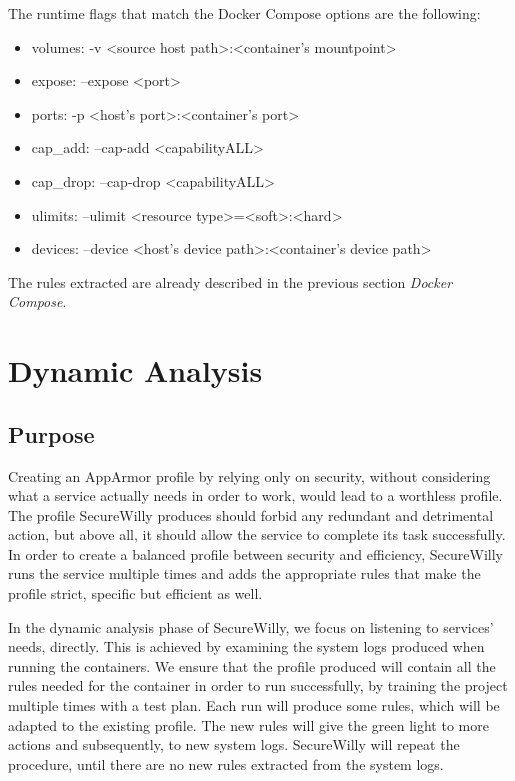 The runtime flags that match the Docker Compose options are the following:
\begin{itemize}
\item volumes: -v \textless source host path\textgreater{}:\textless container's mountpoint\textgreater{}
\item expose: --expose \textless port\textgreater{}
\item ports: -p \textless host's port\textgreater{}:\textless container's port\textgreater{}
\item cap\_add: --cap-add \textless capability\textbar ALL\textgreater{}
\item cap\_drop: --cap-drop \textless capability\textbar ALL\textgreater{}
\item ulimits: --ulimit \textless resource type\textgreater{}=\textless soft\textgreater{}:\textless hard\textgreater{}
\item devices: --device \textless host's device path\textgreater{}:\textless container's device path\textgreater{}
\end{itemize}

The rules extracted are already described in the previous section \textit{Docker Compose}. 

\section{Dynamic Analysis}

\subsection{Purpose}
Creating an AppArmor profile by relying only on security, without considering what a service actually needs in order to work, would lead to a worthless profile. The profile SecureWilly produces should forbid any redundant and detrimental action, but above all, it should allow the service to complete its task successfully. In order to create a balanced profile between security and efficiency, SecureWilly runs the service multiple times and adds the appropriate rules that make the profile strict, specific but efficient as well.

In the dynamic analysis phase of SecureWilly, we focus on listening to services' needs, directly. This is achieved by examining the system logs produced when running the containers. We ensure that the profile produced will contain all the rules needed for the container in order to run successfully, by training the project multiple times with a test plan. Each run will produce some rules, which will be adapted to the existing profile. The new rules will give the green light to more actions and subsequently, to new system logs. SecureWilly will repeat the procedure, until there are no new rules extracted from the system logs.

